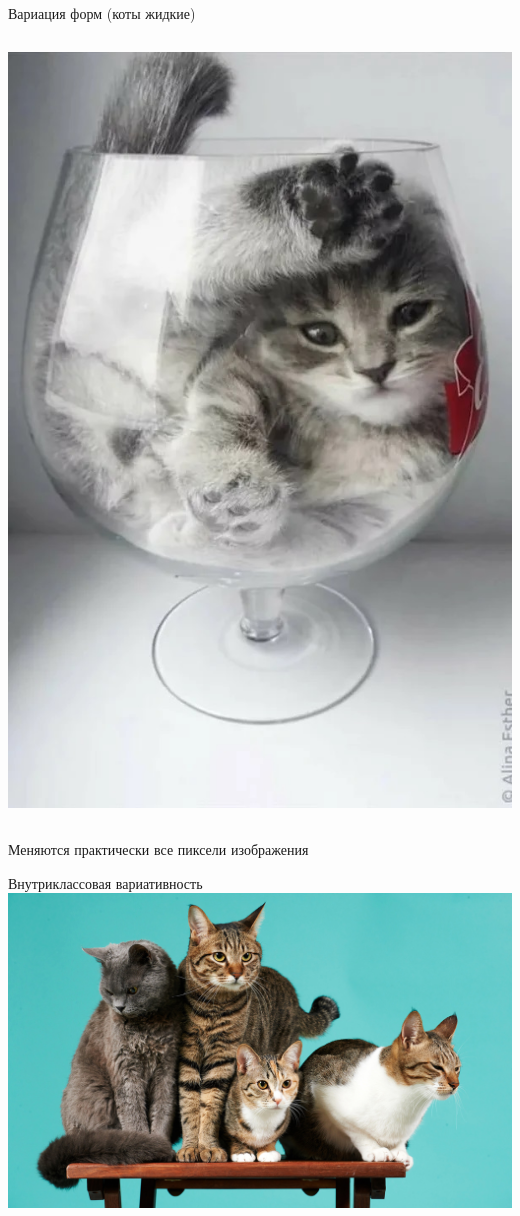 \documentclass[aspectratio=169, professionalfonts]{beamer}
\begin{document}
\begin{frame}{Вариация форм (коты жидкие)}
\begin{columns}
\begin{column}{.25\linewidth}
            \includegraphics[width=\linewidth]{figures/fig24-cat.jpg}
        \end{column}
    \end{columns}
    \begin{center}
        Меняются практически все пиксели изображения
    \end{center}
\end{frame}

\begin{frame}{Внутриклассовая вариативность}
    \centering
    \includegraphics[width=.77\linewidth]{figures/fig25-cats.jpg}
\end{frame}
\end{document}
